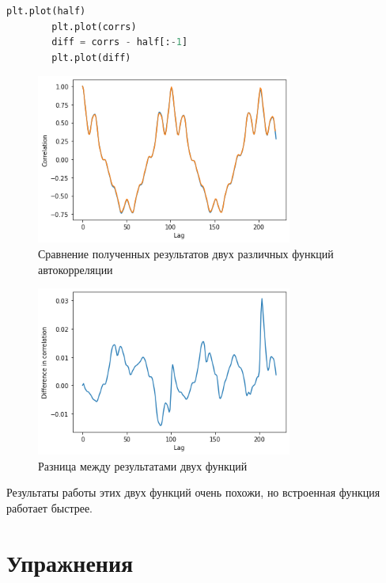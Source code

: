 \documentclass[a4paper, 12pt]{report}
\begin{document}
	\begin{lstlisting}[language=Python,caption=Сравнение двух функций]
		plt.plot(half)
		plt.plot(corrs)	
		diff = corrs - half[:-1]
		plt.plot(diff)
	\end{lstlisting}
	\begin{figure}[H]
		\centering
		\includegraphics[width=0.75\textwidth]{acr9.png}
		\caption{Сравнение полученных результатов двух различных функций автокорреляции}
		\label{fig:arc9}
	\end{figure}
	\begin{figure}[H]
		\centering
		\includegraphics[width=0.75\textwidth]{acr10.png}
		\caption{Разница между результатами двух функций}
		\label{fig:arc10}
	\end{figure}
	Результаты работы этих двух функций очень похожи, но встроенная функция работает быстрее.
	
	\chapter{Упражнения}
\end{document}
